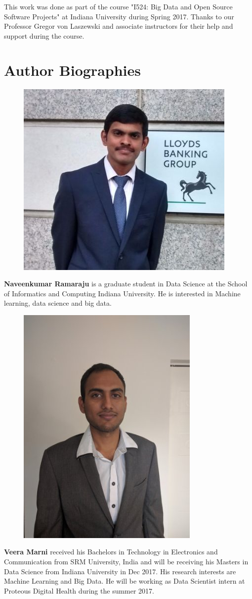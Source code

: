 \documentclass[9pt,twocolumn,twoside]{../../styles/osajnl}
\begin{document}
	This work was done as part of the course "I524: Big Data and
	Open Source Software Projects" at Indiana University during
	Spring 2017. Thanks to our Professor Gregor von Laszewski
	and associate instructors for their help and support during the
	course.
	
	\section*{Author Biographies}
	\begingroup
	\setlength\intextsep{0pt}
	\begin{minipage}[t][3.2cm][t]{1.0\columnwidth} %
		\begin{figure}
			\includegraphics[width=0.25\columnwidth]{images/nr}
		\end{figure}
		\noindent
		{\bfseries Naveenkumar Ramaraju} is a graduate student  in 
		Data Science at the School of Informatics and Computing 
		Indiana University. He is interested in
		Machine learning, data science and big data.
		\end{minipage}
	\begin{minipage}[t][3.2cm][t]{1.0\columnwidth} %
		\begin{figure}
			\includegraphics[width=0.25\columnwidth]{images/linkedIN}
		\end{figure}
		\noindent
		{\bfseries Veera Marni} received his Bachelors in Technology 
		in Electronics and Communication from SRM University, India 
		and will be receiving his Masters in Data Science from 
		Indiana University in Dec 2017. His research interests are 
		Machine Learning and Big Data. He will be working as Data 
		Scientist intern at Proteous Digital Health during the summer 
		2017.
	\end{minipage}
	
\end{document}
